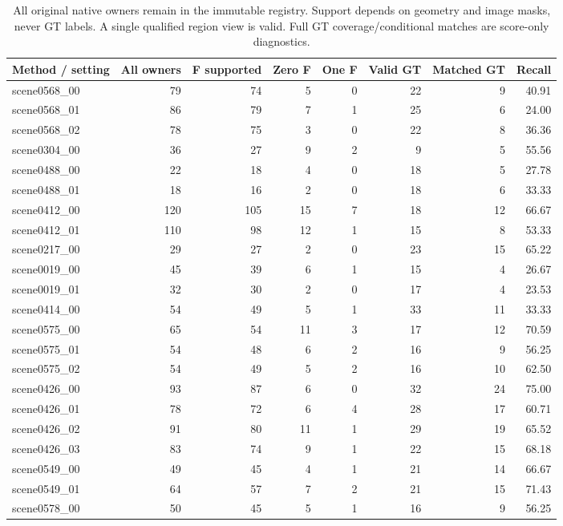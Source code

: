 \begin{table}[t]
\centering
\small
\caption{All original native owners remain in the immutable registry. Support depends on geometry and image masks, never GT labels. A single qualified region view is valid. Full GT coverage/conditional matches are score-only diagnostics.}
\label{tab:benchmark-s6}
\begin{tabular}{lrrrrrrr}
\toprule
Method / setting & All owners & F supported & Zero F & One F & Valid GT & Matched GT & Recall \\
\midrule
scene0568\_00 & 79 & 74 & 5 & 0 & 22 & 9 & 40.91 \\
scene0568\_01 & 86 & 79 & 7 & 1 & 25 & 6 & 24.00 \\
scene0568\_02 & 78 & 75 & 3 & 0 & 22 & 8 & 36.36 \\
scene0304\_00 & 36 & 27 & 9 & 2 & 9 & 5 & 55.56 \\
scene0488\_00 & 22 & 18 & 4 & 0 & 18 & 5 & 27.78 \\
scene0488\_01 & 18 & 16 & 2 & 0 & 18 & 6 & 33.33 \\
scene0412\_00 & 120 & 105 & 15 & 7 & 18 & 12 & 66.67 \\
scene0412\_01 & 110 & 98 & 12 & 1 & 15 & 8 & 53.33 \\
scene0217\_00 & 29 & 27 & 2 & 0 & 23 & 15 & 65.22 \\
scene0019\_00 & 45 & 39 & 6 & 1 & 15 & 4 & 26.67 \\
scene0019\_01 & 32 & 30 & 2 & 0 & 17 & 4 & 23.53 \\
scene0414\_00 & 54 & 49 & 5 & 1 & 33 & 11 & 33.33 \\
scene0575\_00 & 65 & 54 & 11 & 3 & 17 & 12 & 70.59 \\
scene0575\_01 & 54 & 48 & 6 & 2 & 16 & 9 & 56.25 \\
scene0575\_02 & 54 & 49 & 5 & 2 & 16 & 10 & 62.50 \\
scene0426\_00 & 93 & 87 & 6 & 0 & 32 & 24 & 75.00 \\
scene0426\_01 & 78 & 72 & 6 & 4 & 28 & 17 & 60.71 \\
scene0426\_02 & 91 & 80 & 11 & 1 & 29 & 19 & 65.52 \\
scene0426\_03 & 83 & 74 & 9 & 1 & 22 & 15 & 68.18 \\
scene0549\_00 & 49 & 45 & 4 & 1 & 21 & 14 & 66.67 \\
scene0549\_01 & 64 & 57 & 7 & 2 & 21 & 15 & 71.43 \\
scene0578\_00 & 50 & 45 & 5 & 1 & 16 & 9 & 56.25 \\

\end{tabular}
\end{table}
